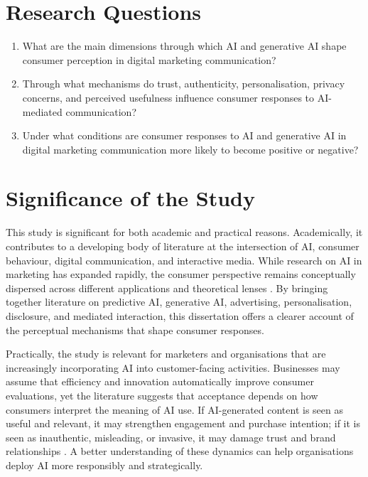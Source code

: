 \section{Research Questions}
\begin{enumerate}
    \item What are the main dimensions through which AI and generative AI shape consumer perception in digital marketing communication?
    \item Through what mechanisms do trust, authenticity, personalisation, privacy concerns, and perceived usefulness influence consumer responses to AI-mediated communication?
    \item Under what conditions are consumer responses to AI and generative AI in digital marketing communication more likely to become positive or negative?
\end{enumerate}

\section{Significance of the Study}
This study is significant for both academic and practical reasons. Academically, it contributes to a developing body of literature at the intersection of AI, consumer behaviour, digital communication, and interactive media. While research on AI in marketing has expanded rapidly, the consumer perspective remains conceptually dispersed across different applications and theoretical lenses \cite{jain2024twodecades,ubal2024framework}. By bringing together literature on predictive AI, generative AI, advertising, personalisation, disclosure, and mediated interaction, this dissertation offers a clearer account of the perceptual mechanisms that shape consumer responses.

Practically, the study is relevant for marketers and organisations that are increasingly incorporating AI into customer-facing activities. Businesses may assume that efficiency and innovation automatically improve consumer evaluations, yet the literature suggests that acceptance depends on how consumers interpret the meaning of AI use. If AI-generated content is seen as useful and relevant, it may strengthen engagement and purchase intention; if it is seen as inauthentic, misleading, or invasive, it may damage trust and brand relationships \cite{kirk2025aiauthorship,an2025personalized,israfilzade2025advertising}. A better understanding of these dynamics can help organisations deploy AI more responsibly and strategically.

